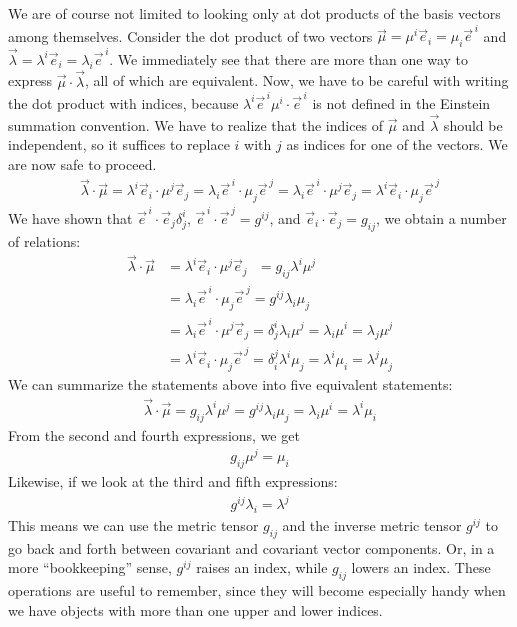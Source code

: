 \documentclass{book}
\theoremstyle{definition}
\begin{document}
We are of course not limited to looking only at dot products of the basis vectors among themselves. Consider the dot product of two vectors $\vec{\mu} = \mu^i\vec{e}_i=\mu_i\vec{e}^{\,i}$ and $\vec{\lambda} = \lambda^i\vec{e}_i = \lambda_i\vec{e}^{\,i}$. We immediately see that there are more than one way to express $\vec{\mu}\cdot\vec{\lambda}$, all of which are equivalent. Now, we have to be careful with writing the dot product with indices, because $\lambda^i\vec{e}^{\,i}\mu^i\cdot\vec{e}^{\,i}$ is not defined in the Einstein summation convention. We have to realize that the indices of $\vec{\mu}$ and $\vec{\lambda}$ should be independent, so it suffices to replace $i$ with $j$ as indices for one of the vectors. We are now safe to proceed. 
\begin{align*}
\boxed{
\vec{\lambda}\cdot\vec{\mu} = \lambda^i\vec{e}_i\cdot\mu^j\vec{e}_j = \lambda_i\vec{e}^{\,i}\cdot\mu_j\vec{e}^{\,j} = \lambda_i\vec{e}^{\,i}\cdot\mu^j\vec{e}_j = \lambda^i\vec{e}_{i}\cdot\mu_j\vec{e}^{\,j}
}
\end{align*}
We have shown that $\vec{e}^{\,i}\cdot\vec{e}_j \delta^i_j$, $\vec{e}^{\,i}\cdot\vec{e}^{\,j} = g^{ij}$, and $\vec{e}_i\cdot\vec{e}_j = g_{ij}$, we obtain a number of relations:
\begin{align*}
\vec{\lambda}\cdot\vec{\mu} &= \lambda^i\vec{e}_i\cdot\mu^j\vec{e}_j \text{ }= g_{ij}\lambda^i\mu^j \nonumber\\
 &= \lambda_i\vec{e}^{\,i}\cdot\mu_j\vec{e}^{\,j} = g^{ij}\lambda_i\mu_j \nonumber\\
 &= \lambda_i\vec{e}^{\,i}\cdot\mu^j\vec{e}_j = \delta^i_j\lambda_i \mu^j = \lambda_i\mu^i = \lambda_j\mu^j \nonumber \\
 &= \lambda^i\vec{e}_{i}\cdot\mu_j\vec{e}^{\,j} = \delta^j_i\lambda^i \mu_j = \lambda^i\mu_i = \lambda^j\mu_j \nonumber
\end{align*}
We can summarize the statements above into five equivalent statements:
\begin{align*}
\boxed{\vec{\lambda}\cdot\vec{\mu} = g_{ij}\lambda^i\mu^j = g^{ij}\lambda_i\mu_j = \lambda_i\mu^i = \lambda^i\mu_i}
\end{align*}
From the second and fourth expressions, we get
\begin{align*}
\boxed{g_{ij}\mu^j = \mu_i}
\end{align*}
Likewise, if we look at the third and fifth expressions:
\begin{align*}
\boxed{g^{ij}\lambda_i = \lambda^j}
\end{align*}
This means we can use the metric tensor $g_{ij}$ and the inverse metric tensor $g^{ij}$ to go back and forth between covariant and covariant vector components. Or, in a more ``bookkeeping'' sense, $g^{ij}$ raises an index, while $g_{ij}$ lowers an index. These operations are useful to remember, since they will become especially handy when we have objects with more than one upper and lower indices. \\
\end{document}
